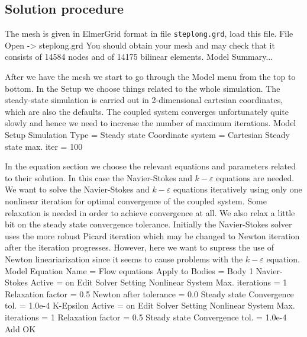 %


\subsection*{Solution procedure}

The mesh is given in ElmerGrid format in file \texttt{steplong.grd}, load this file.
\ttbegin
File 
  Open -> steplong.grd
\ttend
You should obtain your mesh and may check that it consists of 14584 nodes and of 
14175 bilinear elements.
\ttbegin
Model 
  Summary...
\ttend

After we have the mesh we start to go through the Model menu from the top to bottom. 
In the Setup we choose things related to the whole simulation.
The steady-state simulation is carried out in 2-dimensional cartesian
coordinates, which are also the defaults.  
The coupled system converges unfortunately quite slowly and hence we need to increase the number of maximum 
iterations. 
\ttbegin
Model
  Setup 
    Simulation Type = Steady state
    Coordinate system = Cartesian
    Steady state max. iter = 100
\ttend

In the equation section we choose the relevant equations and 
parameters related to their solution. 
In this case the Navier-Stokes and $k-\varepsilon$ equations are needed.
We want to solve the Navier-Stokes and $k-\varepsilon$ equations iteratively using only one nonlinear iteration
for optimal convergence of the coupled system. Some relaxation is needed in order to achieve convergence 
at all. We also relax a little bit on the steady state convergence tolerance. 
Initially the Navier-Stokes
solver uses the more robust Picard iteration which may be changed to Newton iteration after the iteration 
progresses. However, here we want to supress the use of Newton lineariarization since it seems to
cause problems with the $k-\varepsilon$ equation.
\ttbegin
Model
  Equation
    Name = Flow equations
    Apply to Bodies = Body 1
    Navier-Stokes 
      Active = on
      Edit Solver Setting
        Nonlinear System
          Max. iterations = 1
          Relaxation factor = 0.5
          Newton after tolerance = 0.0
        Steady state
          Convergence tol. = 1.0e-4
    K-Epsilon 
      Active = on
      Edit Solver Setting
        Nonlinear System
          Max. iterations = 1
          Relaxation factor = 0.5
        Steady state
          Convergence tol. = 1.0e-4
    Add 
    OK
\ttend        

